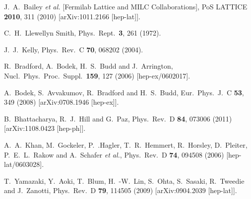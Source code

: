 \begin{thebibliography}{99}
  J.~A.~Bailey {\it et al.}  [Fermilab Lattice and MILC Collaborations],
  PoS LATTICE {\bf 2010}, 311 (2010)
  [arXiv:1011.2166 [hep-lat]].
  
  C.~H.~Llewellyn Smith,
  Phys.\ Rept.\  {\bf 3}, 261 (1972).

  J.~J.~Kelly,
  Phys.\ Rev.\ C {\bf 70}, 068202 (2004).
  
  R.~Bradford, A.~Bodek, H.~S.~Budd and J.~Arrington,
  Nucl.\ Phys.\ Proc.\ Suppl.\  {\bf 159}, 127 (2006)
  [hep-ex/0602017].

  A.~Bodek, S.~Avvakumov, R.~Bradford and H.~S.~Budd,
  Eur.\ Phys.\ J.\ C {\bf 53}, 349 (2008)
  [arXiv:0708.1946 [hep-ex]].

  B.~Bhattacharya, R.~J.~Hill and G.~Paz,
  Phys.\ Rev.\ D {\bf 84}, 073006 (2011)
  [arXiv:1108.0423 [hep-ph]].
  
  A.~A.~Khan, M.~Gockeler, P.~.Hagler, T.~R.~Hemmert, R.~Horsley, D.~Pleiter, P.~E.~L.~Rakow and A.~Schafer {\it et al.},
  Phys.\ Rev.\ D {\bf 74}, 094508 (2006)
  [hep-lat/0603028].

  T.~Yamazaki, Y.~Aoki, T.~Blum, H.~-W.~Lin, S.~Ohta, S.~Sasaki, R.~Tweedie and J.~Zanotti,
  Phys.\ Rev.\ D {\bf 79}, 114505 (2009)
  [arXiv:0904.2039 [hep-lat]].
  

\end{thebibliography}
